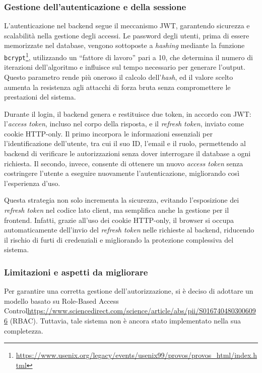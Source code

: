 \subsubsection{Gestione dell'autenticazione e della sessione}
L'autenticazione nel backend segue il meccanismo JWT, garantendo sicurezza e scalabilità nella gestione degli accessi. Le password degli utenti, prima di essere memorizzate nel database, vengono sottoposte a \textit{hashing} mediante la funzione \texttt{bcrypt}\footnote{\url{https://www.usenix.org/legacy/events/usenix99/provos/provos_html/index.html}}, utilizzando un ``fattore di lavoro'' pari a 10, che determina il numero di iterazioni dell'algoritmo e influisce sul tempo necessario per generare l'output. Questo parametro rende più oneroso il calcolo dell'\textit{hash}, ed il valore scelto aumenta la resistenza agli attacchi di forza bruta senza compromettere le prestazioni del sistema.

Durante il login, il backend genera e restituisce due token, in accordo con JWT: l'\textit{access token}, incluso nel corpo della risposta, e il \textit{refresh token}, inviato come cookie HTTP-only. Il primo incorpora le informazioni essenziali per l'identificazione dell'utente, tra cui il suo ID, l'email e il ruolo, permettendo al backend di verificare le autorizzazioni senza dover interrogare il database a ogni richiesta. Il secondo, invece, consente di ottenere un nuovo \textit{access token} senza costringere l'utente a eseguire nuovamente l'autenticazione, migliorando così l'esperienza d'uso.

Questa strategia non solo incrementa la sicurezza, evitando l’esposizione dei \textit{refresh token} nel codice lato client, ma semplifica anche la gestione per il frontend. Infatti, grazie all'uso dei cookie HTTP-only, il browser si occupa automaticamente dell'invio del \textit{refresh token} nelle richieste al backend, riducendo il rischio di furti di credenziali e migliorando la protezione complessiva del sistema.

\subsubsection{Limitazioni e aspetti da migliorare}
Per garantire una corretta gestione dell'autorizzazione, si è deciso di adottare un modello basato su Role-Based Access Control\footins\url{https://www.sciencedirect.com/science/article/abs/pii/S0167404803006096} (RBAC). Tuttavia, tale sistema non è ancora stato implementato nella sua completezza.

